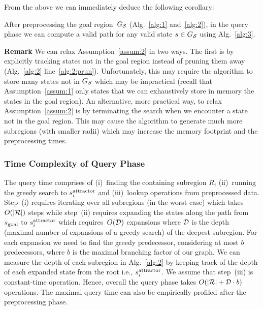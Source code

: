 \documentclass[a4paper,10pt]{article}
\begin{document}
From the above we can immediately deduce the following corollary:

\vspace{2mm}

\begin{cor}
  After preprocessing the goal region~$G_\mathcal{S}$ (Alg.~\ref{alg:1} and~\ref{alg:2}), in the query phase we can compute a valid path for any valid state $s \in G_\mathcal{S}$ using Alg.~\ref{alg:3}.
\end{cor}


\textbf{Remark}
We can relax Assumption~\ref{assum:2} in two ways.
The first is by explicitly tracking states not in the goal region instead of pruning them away (Alg.~\ref{alg:2} line~\ref{alg:2:prun}).
Unfortunately, this may require the algorithm to store many states not in $G_\mathcal{S}$  which may be impractical (recall that Assumption~\ref{assum:1} only states that we can exhaustively store in memory the states in the goal region).
An alternative, more practical way, to relax Assumption~\ref{assum:2}  is by terminating the search when we  encounter a state not in the goal region.
This may cause the algorithm to generate much more subregions (with smaller radii) which may increase the memory footprint and the preprocessing times.


\subsubsection{Time Complexity of Query Phase}
\label{subsec:complexity}
The query time comprises of 
(i)~finding the containing subregion $R_i$
(ii)~running the greedy search to $s^{\text{attractor}}_i$
and
(iii)~lookup operations from preprocessed data.
Step~(i) requires iterating over all subregions (in the worst case) which takes $O(|\mathcal{R}|)$ steps while 
step~(ii) requires expanding the states along the path from $s_{\text{goal}}$ to $s^{\text{attractor}}_i$ which requires~$O(\mathcal{D})$ expansions where $\mathcal{D}$ is the depth (maximal number of expansions of a greedy search) of the deepest subregion. 
For each expansion we need to find the greedy predecessor, considering at most $b$ predecessors, where $b$ is the maximal branching factor of our graph.
We can measure the depth of each subregion in Alg.~\ref{alg:2} by keeping track of the depth of each expanded state from the root i.e., $s^{\text{attractor}}_i$. We assume that step~(iii) is constant-time operation. Hence, overall the query phase takes $O(|\mathcal{R}| + \mathcal{D} \cdot b)$ operations. The maximal query time can also be empirically profiled after the preprocessing phase.
\end{document}
